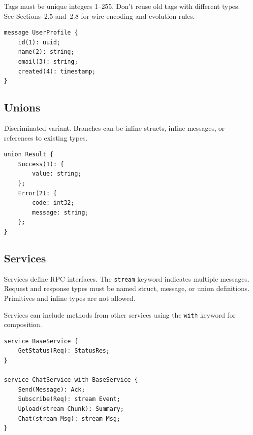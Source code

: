 \documentclass[10pt,onecolumn]{article}
\begin{document}
\begin{minipage}[t]{0.52\textwidth}
Tags must be unique integers 1--255. Don't reuse old tags with different types. See Sections~2.5 and~2.8 for wire encoding and evolution rules.
\end{minipage}\hfill
\begin{minipage}[t]{0.44\textwidth}
\begin{lstlisting}[language=bebop,aboveskip=0pt,belowskip=0pt]
message UserProfile {
    id(1): uuid;
    name(2): string;
    email(3): string;
    created(4): timestamp;
}
\end{lstlisting}
\end{minipage}


\subsection{Unions}

\begin{minipage}[t]{0.52\textwidth}
Discriminated variant. Branches can be inline structs, inline messages, or references to existing types.
\end{minipage}\hfill
\begin{minipage}[t]{0.44\textwidth}
\begin{lstlisting}[language=bebop,aboveskip=0pt,belowskip=0pt]
union Result {
    Success(1): {
        value: string;
    };
    Error(2): {
        code: int32;
        message: string;
    };
}
\end{lstlisting}
\end{minipage}


\subsection{Services}

\begin{minipage}{\textwidth}
\begin{minipage}[t]{0.48\textwidth}
\raggedright
Services define RPC interfaces. The \texttt{stream} keyword indicates multiple messages. Request and response types must be named struct, message, or union definitions. Primitives and inline types are not allowed.

Services can include methods from other services using the \texttt{with} keyword for composition.
\end{minipage}\hfill
\begin{minipage}[t]{0.48\textwidth}
\begin{lstlisting}[language=bebop,aboveskip=0pt,belowskip=0pt]
service BaseService {
    GetStatus(Req): StatusRes;
}

service ChatService with BaseService {
    Send(Message): Ack;
    Subscribe(Req): stream Event;
    Upload(stream Chunk): Summary;
    Chat(stream Msg): stream Msg;
}
\end{lstlisting}
\end{minipage}
\end{minipage}
\end{document}

